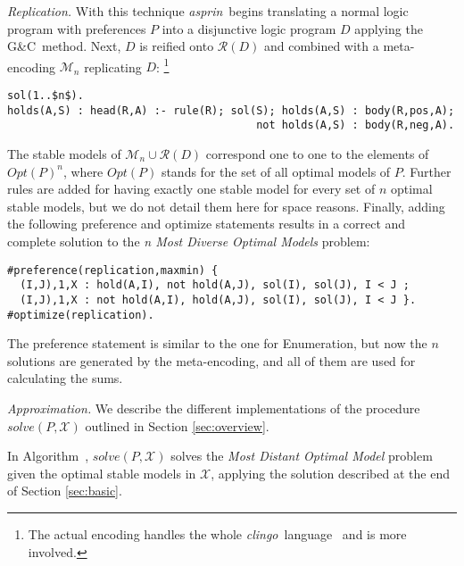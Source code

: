\documentclass[a4paper,USenglish]{oasics-v2016}
\newcommand{\gc}[0]{G{\&}C}
\newcommand{\sysfont}{\textit}
\newcommand{\asprin}{\sysfont{asprin}}
\newcommand{\clingo}{\sysfont{clingo}}
\newcommand{\Alabel}[1]{\textcolor{darkgray}{\small\sffamily\bfseries\mathversion{bold}{A-#1}}}
\begin{document}
\emph{Replication.}
%
With this technique  \asprin\ begins translating a normal logic program with preferences $P$ 
into a disjunctive logic program $D$ applying the \gc\ method.
%
Next, $D$ is reified onto $\mathcal{R}(D)$ and combined with a meta-encoding $\mathcal{M}_n$ 
replicating $D$:%
\footnote{The actual encoding handles the whole \clingo\ language~\cite{gekakasc14b} and is more involved.}
\begin{lstlisting}[mathescape=true]
sol(1..$n$).
holds(A,S) : head(R,A) :- rule(R); sol(S); holds(A,S) : body(R,pos,A);
                                       not holds(A,S) : body(R,neg,A).
\end{lstlisting}
%
The stable models of $\mathcal{M}_n \cup \mathcal{R}(D)$ correspond one to one 
to the elements of $\mathit{Opt}(P)^n$, 
where $\mathit{Opt}(P)$ stands for the set of all optimal models of $P$.
%
Further rules are added for having exactly one stable model for every set of $n$ optimal stable models, 
but we do not detail them here for space reasons.
%
Finally, adding the following preference and optimize statements results  
in a correct and complete solution to the \emph{n Most Diverse Optimal Models} problem:
\begin{lstlisting}
#preference(replication,maxmin) { 
  (I,J),1,X : hold(A,I), not hold(A,J), sol(I), sol(J), I < J ; 
  (I,J),1,X : not hold(A,I), hold(A,J), sol(I), sol(J), I < J }.
#optimize(replication).
\end{lstlisting}
The preference statement is similar to the one for Enumeration, 
but now the $n$ solutions are generated by the meta-encoding, 
and all of them are used for calculating the sums.

\emph{Approximation.}
%
We describe the different implementations of the procedure 
$\mathit{solve}(P,\mathcal{X})$ outlined in Section \ref{sec:overview}. 

%
In Algorithm~\Alabel{1}, $\mathit{solve}(P,\mathcal{X})$ solves the
\emph{Most Distant Optimal Model} problem given the optimal stable models in $\mathcal{X}$,
applying the solution 
%
described at the end of Section \ref{sec:basic}. %
%
\end{document}
